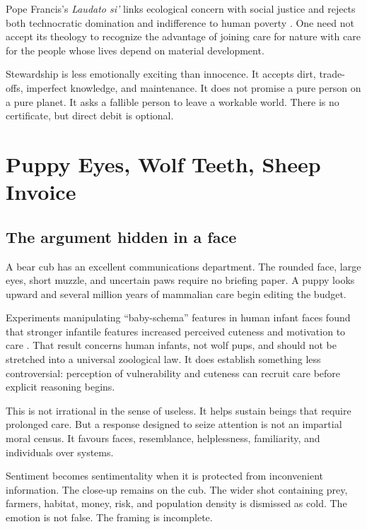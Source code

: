 \documentclass[12pt,a4paper]{book}
\begin{document}
Pope Francis's \emph{Laudato si'} links ecological concern with social justice
and rejects both technocratic domination and indifference to human poverty
\cite{FrancisLaudatoSi2015}.  One need not accept its theology to recognize the
advantage of joining care for nature with care for the people whose lives
depend on material development.

Stewardship is less emotionally exciting than innocence.  It accepts dirt,
trade-offs, imperfect knowledge, and maintenance.  It does not promise a pure
person on a pure planet.  It asks a fallible person to leave a workable world.
There is no certificate, but direct debit is optional.

\chapter{Puppy Eyes, Wolf Teeth, Sheep Invoice}
\label{chap:puppy-wolf-invoice}

\section{The argument hidden in a face}

A bear cub has an excellent communications department.  The rounded face,
large eyes, short muzzle, and uncertain paws require no briefing paper.  A
puppy looks upward and several million years of mammalian care begin editing
the budget.

Experiments manipulating ``baby-schema'' features in human infant faces found
that stronger infantile features increased perceived cuteness and motivation
to care \cite{GlockerBabySchema2009}.  That result concerns human infants, not
wolf pups, and should not be stretched into a universal zoological law.  It
does establish something less controversial: perception of vulnerability and
cuteness can recruit care before explicit reasoning begins.

This is not irrational in the sense of useless.  It helps sustain beings that
require prolonged care.  But a response designed to seize attention is not an
impartial moral census.  It favours faces, resemblance, helplessness,
familiarity, and individuals over systems.

Sentiment becomes sentimentality when it is protected from inconvenient
information.  The close-up remains on the cub.  The wider shot containing prey,
farmers, habitat, money, risk, and population density is dismissed as cold.
The emotion is not false.  The framing is incomplete.
\end{document}
